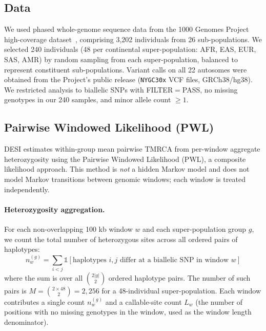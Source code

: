 
\subsection*{Data}

We used phased whole-genome sequence data from the 1000 Genomes Project high-coverage dataset~\citep{Byrska2022}, comprising 3,202 individuals from 26 sub-populations. We selected 240 individuals (48 per continental super-population: AFR, EAS, EUR, SAS, AMR) by random sampling from each super-population, balanced to represent constituent sub-populations. Variant calls on all 22 autosomes were obtained from the Project's public release (\texttt{NYGC30x} VCF files, GRCh38/hg38). We restricted analysis to biallelic SNPs with FILTER$=$PASS, no missing genotypes in our 240 samples, and minor allele count $\geq 1$.

\subsection*{Pairwise Windowed Likelihood (PWL)}

DESI estimates within-group mean pairwise TMRCA from per-window aggregate heterozygosity using the Pairwise Windowed Likelihood (PWL), a composite likelihood approach. This method is \textit{not} a hidden Markov model and does not model Markov transitions between genomic windows; each window is treated independently.

\paragraph{Heterozygosity aggregation.}
For each non-overlapping 100 kb window $w$ and each super-population group $g$, we count the total number of heterozygous sites across all ordered pairs of haplotypes:
\[
n_w^{(g)} = \sum_{i < j} \mathbb{1}[\text{haplotypes } i,j \text{ differ at a biallelic SNP in window } w]
\]
where the sum is over all $\binom{2|g|}{2}$ ordered haplotype pairs. The number of such pairs is $M = \binom{2 \times 48}{2} = 2{,}256$ for a 48-individual super-population. Each window contributes a single count $n_w^{(g)}$ and a callable-site count $L_w$ (the number of positions with no missing genotypes in the window, used as the window length denominator).


